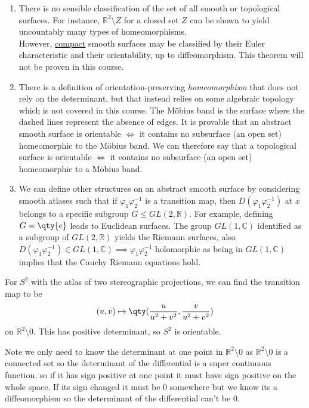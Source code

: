 \begin{remark}
	\begin{enumerate}
		\item 	There is no sensible classification of the set of all smooth or topological surfaces.
		For instance, $\mathbb R^2 \setminus Z$ for a closed set $Z$ can be shown to yield uncountably many types of homeomorphisms. \\
		However, \underline{compact} smooth surfaces may be classified by their Euler characteristic and their orientability, up to diffeomorphism.
		This theorem will not be proven in this course.
		\item 	There is a definition of orientation-preserving \textit{homeomorphism} that does not rely on the determinant, but that instead relies on some algebraic topology which is not covered in this course.
		The M\"obius band is the surface
		where the dashed lines represent the absence of edges.
		It is provable that an abstract smooth surface is orientable $\iff$ it contains no subsurface (an open set) homeomorphic to the M\"obius band.
		We can therefore say that a topological surface is orientable $\iff$ it contains no subsurface (an open set) homeomorphic to a M\"obius band.
		\item 	We can define other structures on an abstract smooth surface by considering smooth atlases such that if $\varphi_1 \varphi_2^{-1}$ is a transition map, then $D (\varphi_1 \varphi_2^{-1})$ at $x$ belongs to a specific subgroup $G \leq GL(2, \mathbb R)$.
		For example, defining $G = \qty{e}$ leads to Euclidean surfaces.
		The group $GL(1, \mathbb C)$ identified as a subgroup of $GL(2, \mathbb R)$ yields the Riemann surfaces, also $D (\varphi_1 \varphi_2^{-1}) \in GL(1, \mathbb C) \implies \varphi_1 \varphi_2^{-1}$ holomorphic as being in $GL(1, \mathbb C)$ implies that the Cauchy Riemann equations hold.
	\end{enumerate}
\end{remark}

\begin{example}
	For $S^2$ with the atlas of two stereographic projections, we can find the transition map to be
	\begin{align*}
		(u,v) \mapsto \qty(\frac{u}{u^2 + v^2}, \frac{v}{u^2 + v^2})
	\end{align*}
	on $\mathbb R^2 \setminus \qty{0}$.
	This has positive determinant, so $S^2$ is orientable.

	Note we only need to know the determinant at one point in $\mathbb{R}^2 \setminus \qty{0}$ as $\mathbb{R}^2 \setminus \qty{0}$ is a connected set so the determinant of the differential is a super continuous function, so if it has sign positive at one point it must have sign positive on the whole space. If its sign changed it must be $0$ somewhere but we know its a diffeomorphism so the determinant of the differential can't be 0.
\end{example}

